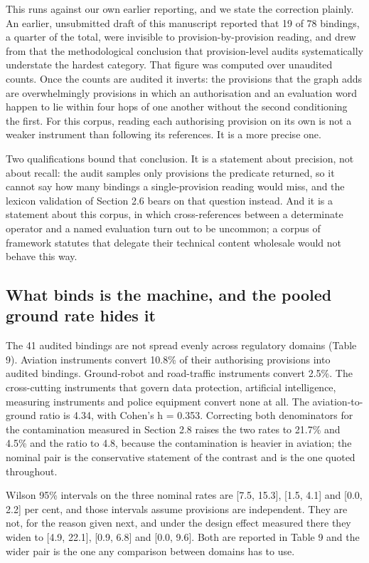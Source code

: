 This runs against our own earlier reporting, and we state the correction plainly. An earlier, unsubmitted draft of this manuscript reported that 19 of 78 bindings, a quarter of the total, were invisible to provision-by-provision reading, and drew from that the methodological conclusion that provision-level audits systematically understate the hardest category. That figure was computed over unaudited counts. Once the counts are audited it inverts: the provisions that the graph adds are overwhelmingly provisions in which an authorisation and an evaluation word happen to lie within four hops of one another without the second conditioning the first. For this corpus, reading each authorising provision on its own is not a weaker instrument than following its references. It is a more precise one.

Two qualifications bound that conclusion. It is a statement about precision, not about recall: the audit samples only provisions the predicate returned, so it cannot say how many bindings a single-provision reading would miss, and the lexicon validation of Section 2.6 bears on that question instead. And it is a statement about this corpus, in which cross-references between a determinate operator and a named evaluation turn out to be uncommon; a corpus of framework statutes that delegate their technical content wholesale would not behave this way.

\subsection{What binds is the machine, and the pooled ground rate hides it}\label{sec:3.3}

The 41 audited bindings are not spread evenly across regulatory domains (Table 9). Aviation instruments convert 10.8\% of their authorising provisions into audited bindings. Ground-robot and road-traffic instruments convert 2.5\%. The cross-cutting instruments that govern data protection, artificial intelligence, measuring instruments and police equipment convert none at all. The aviation-to-ground ratio is 4.34, with Cohen's h = 0.353. Correcting both denominators for the contamination measured in Section 2.8 raises the two rates to 21.7\% and 4.5\% and the ratio to 4.8, because the contamination is heavier in aviation; the nominal pair is the conservative statement of the contrast and is the one quoted throughout.

Wilson 95\% intervals on the three nominal rates are [7.5, 15.3], [1.5, 4.1] and [0.0, 2.2] per cent, and those intervals assume provisions are independent. They are not, for the reason given next, and under the design effect measured there they widen to [4.9, 22.1], [0.9, 6.8] and [0.0, 9.6]. Both are reported in Table 9 and the wider pair is the one any comparison between domains has to use.

